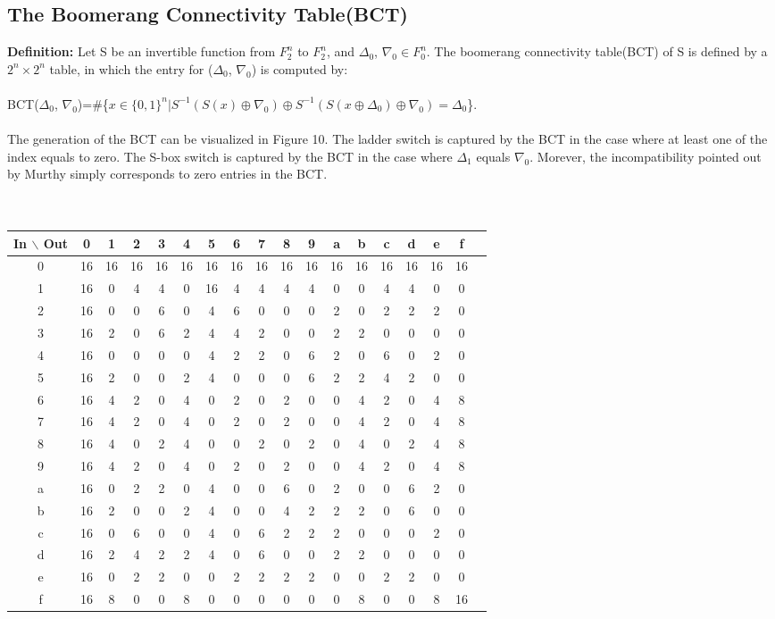 \documentclass{article}
\begin{document}
\subsection{The Boomerang Connectivity Table(BCT)}
\textbf{Definition:} Let S be an invertible function from $F_2^n$ to $F_2^n$, and $\Delta_0$, $\nabla_0 \in F_0^n$. The boomerang connectivity table(BCT) of S is defined by a $2^n \times 2^n$ table, in which the entry for ($\Delta_0$, $\nabla_0$) is computed by:\\\\
BCT($\Delta_0$, $\nabla_0$)=\#\{$x \in \{0,1\}^n|S^{-1}(S(x)\oplus \nabla_0)\oplus S^{-1}(S(x\oplus\Delta_0 )\oplus \nabla_0) = \Delta_0$\}.\\\\
The generation of the BCT can be visualized in Figure 10. The ladder switch is captured by the BCT in the case where at least one of the index equals to zero. The S-box switch is captured by the BCT in the case where $\Delta_1$ equals $\nabla_0$. Morever, the incompatibility pointed out by Murthy simply corresponds to zero entries in the BCT.\\\\\\
\begin{tabular}{c||c c c c c c c c c c c c c c c c c|}
	In $\backslash$ Out &0 &1 & 2 & 3 &4&5&6&7&8&9&a&b&c&d&e&f\\
	\hline\hline
0&16 &16& 16& 16& 16& 16& 16& 16& 16& 16& 16& 16& 16& 16& 16& 16 \\
1&16  &0  &4  &4  &0 &16  &4  &4  &4  &4&  0  &0&  4&  4&  0  &0 \\
2&16  &0  &0  &6  &0  &4  &6  &0  &0  &0&  2& 0&  2&  2&  2  &0 \\
3&16  &2  &0  &6  &2  &4  &4  &2  &0  &0  &2  &2  &0  &0  &0  &0 \\
4&16  &0  &0  &0  &0  &4  &2  &2  &0  &6  &2  &0  &6  &0  &2  &0 \\
5&16  &2  &0  &0  &2  &4  &0  &0  &0  &6  &2  &2  &4  &2  &0  &0 \\
6&16  &4  &2  &0  &4  &0  &2  &0  &2  &0  &0  &4  &2  &0  &4  &8 \\
7&16  &4  &2  &0  &4  &0  &2  &0  &2  &0  &0  &4  &2  &0  &4  &8 \\
8&16  &4  &0  &2  &4  &0  &0  &2  &0  &2  &0  &4  &0  &2  &4  &8 \\
9&16  &4  &2  &0  &4  &0  &2  &0  &2  &0  &0  &4  &2  &0  &4  &8 \\
a&16  &0  &2  &2  &0  &4  &0  &0  &6  &0  &2  &0  &0  &6  &2  &0 \\
b&16  &2  &0  &0  &2  &4  &0  &0  &4  &2  &2  &2  &0  &6  &0  &0 \\
c&16  &0  &6  &0  &0  &4  &0  &6  &2  &2  &2  &0  &0  &0  &2  &0 \\
d&16  &2  &4  &2  &2  &4  &0  &6  &0  &0  &2  &2  &0  &0  &0  &0 \\
e&16  &0  &2  &2  &0  &0  &2  &2  &2  &2  &0  &0  &2  &2  &0  &0 \\
f&16  &8  &0  &0  &8  &0  &0  &0  &0  &0  &0  &8  &0  &0  &8 &16 \\
\end{tabular}\\\\\\
\end{document}
